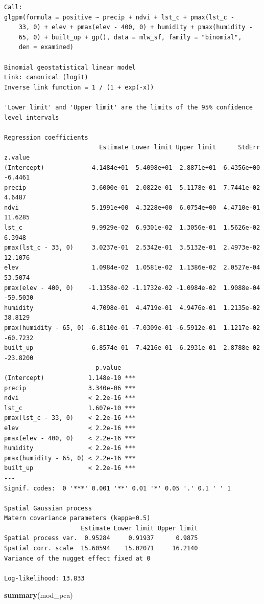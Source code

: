 \documentclass[
  letterpaper,
]{krantz}
\newenvironment{Shaded}{\begin{snugshade}}{\end{snugshade}}
\newcommand{\FunctionTok}[1]{\textcolor[rgb]{0.13,0.29,0.53}{\textbf{#1}}}
\newcommand{\NormalTok}[1]{#1}
\begin{document}
\begin{verbatim}
Call:
glgpm(formula = positive ~ precip + ndvi + lst_c + pmax(lst_c - 
    33, 0) + elev + pmax(elev - 400, 0) + humidity + pmax(humidity - 
    65, 0) + built_up + gp(), data = mlw_sf, family = "binomial", 
    den = examined)

Binomial geostatistical linear model
Link: canonical (logit) 
Inverse link function = 1 / (1 + exp(-x)) 
 
'Lower limit' and 'Upper limit' are the limits of the 95% confidence level intervals

Regression coefficients
                          Estimate Lower limit Upper limit      StdErr  z.value
(Intercept)            -4.1484e+01 -5.4098e+01 -2.8871e+01  6.4356e+00  -6.4461
precip                  3.6000e-01  2.0822e-01  5.1178e-01  7.7441e-02   4.6487
ndvi                    5.1991e+00  4.3228e+00  6.0754e+00  4.4710e-01  11.6285
lst_c                   9.9929e-02  6.9301e-02  1.3056e-01  1.5626e-02   6.3948
pmax(lst_c - 33, 0)     3.0237e-01  2.5342e-01  3.5132e-01  2.4973e-02  12.1076
elev                    1.0984e-02  1.0581e-02  1.1386e-02  2.0527e-04  53.5074
pmax(elev - 400, 0)    -1.1358e-02 -1.1732e-02 -1.0984e-02  1.9088e-04 -59.5030
humidity                4.7098e-01  4.4719e-01  4.9476e-01  1.2135e-02  38.8129
pmax(humidity - 65, 0) -6.8110e-01 -7.0309e-01 -6.5912e-01  1.1217e-02 -60.7232
built_up               -6.8574e-01 -7.4216e-01 -6.2931e-01  2.8788e-02 -23.8200
                         p.value    
(Intercept)            1.148e-10 ***
precip                 3.340e-06 ***
ndvi                   < 2.2e-16 ***
lst_c                  1.607e-10 ***
pmax(lst_c - 33, 0)    < 2.2e-16 ***
elev                   < 2.2e-16 ***
pmax(elev - 400, 0)    < 2.2e-16 ***
humidity               < 2.2e-16 ***
pmax(humidity - 65, 0) < 2.2e-16 ***
built_up               < 2.2e-16 ***
---
Signif. codes:  0 '***' 0.001 '**' 0.01 '*' 0.05 '.' 0.1 ' ' 1

Spatial Gaussian process
Matern covariance parameters (kappa=0.5)
                     Estimate Lower limit Upper limit
Spatial process var.  0.95284     0.91937      0.9875
Spatial corr. scale  15.60594    15.02071     16.2140
Variance of the nugget effect fixed at 0

Log-likelihood: 13.833
\end{verbatim}

\begin{Shaded}
\begin{Highlighting}[]
\FunctionTok{summary}\NormalTok{(mod\_pca)}
\end{Highlighting}
\end{Shaded}
\end{document}
